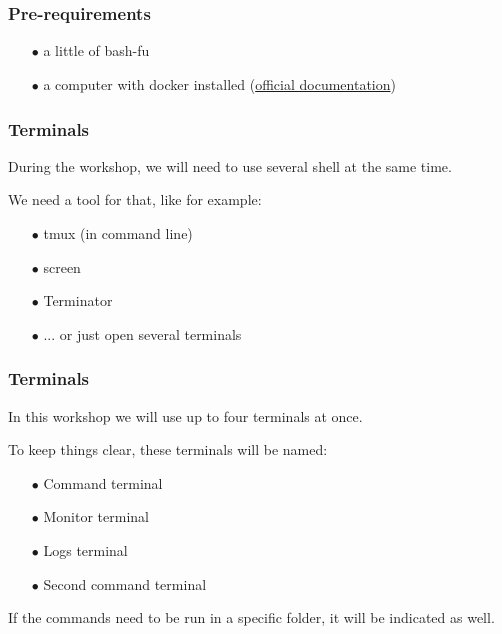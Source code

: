\section*{}

	\begin{frame}
		\frametitle{Pre-requirements}

		\begin{itemize}
			\item[$\bullet$] a little of bash-fu
			\item[$\bullet$] a computer with docker installed (\href{https://docs.docker.com/v17.09/engine/installation/}{official documentation})
		\end{itemize}
		
	\end{frame}
	
	\begin{frame}
		\frametitle{Terminals}
		
		During the workshop, we will need to use several shell at the same time.
		
		\medskip
		
		We need a tool for that, like for example:
		\begin{itemize}
			\item[$\bullet$] tmux (in command line)
			\item[$\bullet$] screen
			\item[$\bullet$] Terminator
			\item[$\bullet$] ... or just open several terminals
		\end{itemize}
	\end{frame}
	
	\begin{frame}
		\frametitle{Terminals}
		
		In this workshop we will use up to four terminals at once.
		
		\bigskip
		
		To keep things clear, these terminals will be named:
		\begin{itemize}
			\item[$\bullet$] Command terminal
			\item[$\bullet$] Monitor terminal
			\item[$\bullet$] Logs terminal
			\item[$\bullet$] Second command terminal
		\end{itemize}
		
		\bigskip
		
		If the commands need to be run in a specific folder, it will be indicated as well.
	\end{frame}

